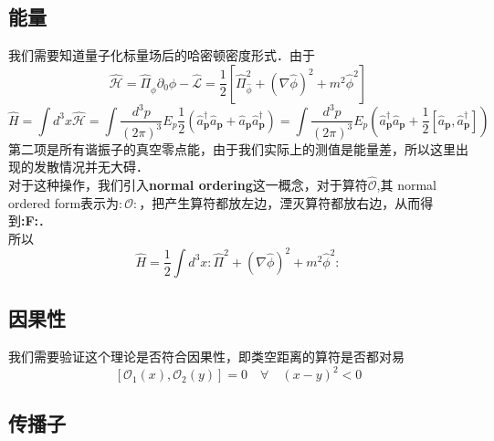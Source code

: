 \subsection{能量}
我们需要知道量子化标量场后的哈密顿密度形式．由于
\begin{equation}
\hat{\mathcal{H}}=\hat{\Pi}_{\hat{\phi}} \partial_{0} \hat{\phi}-\hat{\mathcal{L}}=\frac{1}{2}\left[\hat{\Pi}_{\hat{\phi}}^{2}+(\nabla \hat{\phi})^{2}+m^{2} \hat{\phi}^{2}\right]
\end{equation}
\begin{equation}
\hat{H}=\int d^{3} x \hat{\mathcal{H}}=\int \frac{d^{3} p}{(2 \pi)^{3}} E_{p} \frac{1}{2}\left(\hat{a}_{\mathbf{p}}^{\dagger} \hat{a}_{\mathbf{p}}+\hat{a}_{\mathbf{p}} \hat{a}_{\mathbf{p}}^{\dagger}\right)=\int \frac{d^{3} p}{(2 \pi)^{3}} E_{p}\left(\hat{a}_{\mathbf{p}}^{\dagger} \hat{a}_{\mathbf{p}}+\frac{1}{2}\left[\hat{a}_{\mathbf{p}}, \hat{a}_{\mathbf{p}}^{\dagger}\right]\right)
\end{equation}
第二项是所有谐振子的真空零点能，由于我们实际上的测值是能量差，所以这里出现的发散情况并无大碍．\\
对于这种操作，我们引入\textbf{normal ordering}这一概念，对于算符$\hat{\mathcal{O}}$,其 normal ordered form表示为$:\mathcal{O}:$，把产生算符都放左边，湮灭算符都放右边，从而得到\textbf{:F:}．\\所以
\begin{equation}
\hat{H}=\frac{1}{2} \int d^{3} x: \hat{\Pi}^{2}+(\nabla \hat{\phi})^{2}+m^{2} \hat{\phi}^{2}:
\end{equation}
\subsection{因果性}
我们需要验证这个理论是否符合因果性，即类空距离的算符是否都对易
\begin{equation}
\left[\mathcal{O}_{1}(x), \mathcal{O}_{2}(y)\right]=0 \quad \forall \quad(x-y)^{2}<0
\end{equation}

\subsection{传播子}